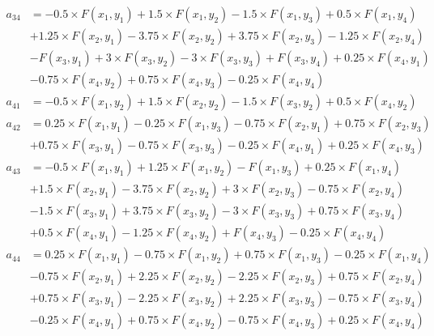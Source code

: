 \documentclass[12pt,oneside,openany,a4paper, %
english, %
masters-t, goldenblock]{usthesis}
\begin{document}
\begin{align}
  a_{34} &= -0.5 \times F(x_1,y_1) + 1.5 \times F(x_1,y_2) - 1.5 \times F(x_1,y_3) + 0.5 \times F(x_1,y_4) \nonumber \\ &+ 1.25 \times F(x_2,y_1) - 3.75 \times F(x_2,y_2) + 3.75 \times F(x_2,y_3) - 1.25 \times F(x_2,y_4) \nonumber \\ &- F(x_3,y_1) + 3 \times F(x_3,y_2) - 3 \times F(x_3,y_3) + F(x_3,y_4) + 0.25 \times F(x_4,y_1) \nonumber \\ &- 0.75 \times F(x_4,y_2) + 0.75 \times F(x_4,y_3) - 0.25 \times F(x_4,y_4) \\
  a_{41} &= -0.5 \times F(x_1,y_2) + 1.5 \times F(x_2,y_2) - 1.5 \times F(x_3,y_2) + 0.5 \times F(x_4,y_2) \\
  a_{42} &= 0.25 \times F(x_1,y_1) - 0.25 \times F(x_1,y_3) - 0.75 \times F(x_2,y_1) + 0.75 \times F(x_2,y_3) \nonumber \\ &+ 0.75 \times F(x_3,y_1) - 0.75 \times F(x_3,y_3) - 0.25 \times F(x_4,y_1) + 0.25 \times F(x_4,y_3) \\
  a_{43} &= -0.5 \times F(x_1,y_1) + 1.25 \times F(x_1,y_2) - F(x_1,y_3) + 0.25 \times F(x_1,y_4) \nonumber \\ &+ 1.5 \times F(x_2,y_1) - 3.75 \times F(x_2,y_2) + 3 \times F(x_2,y_3) - 0.75 \times F(x_2,y_4) \nonumber \\ &- 1.5 \times F(x_3,y_1) + 3.75 \times F(x_3,y_2) - 3 \times F(x_3,y_3) + 0.75 \times F(x_3,y_4) \nonumber \\ &+ 0.5 \times F(x_4,y_1) - 1.25 \times F(x_4,y_2) + F(x_4,y_3) - 0.25 \times F(x_4,y_4) \\
  a_{44} &= 0.25 \times F(x_1,y_1) - 0.75 \times F(x_1,y_2) + 0.75 \times F(x_1,y_3) - 0.25 \times F(x_1,y_4) \nonumber \\ &- 0.75 \times F(x_2,y_1) + 2.25 \times F(x_2,y_2) - 2.25 \times F(x_2,y_3) + 0.75 \times F(x_2,y_4) \nonumber \\ &+ 0.75 \times F(x_3,y_1) - 2.25 \times F(x_3,y_2) + 2.25 \times F(x_3,y_3) - 0.75 \times F(x_3,y_4) \nonumber \\ & - 0.25 \times F(x_4,y_1) + 0.75 \times F(x_4,y_2) - 0.75 \times F(x_4,y_3) + 0.25 \times F(x_4,y_4)
\end{align}

\end{document}
